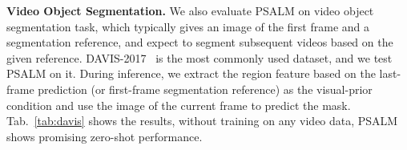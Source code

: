\begin{table}[h!]
\centering
\footnotesize
\caption{Our method's zero-shot performance on DAVIS-2017 \textit{val}. Note the SEEM report results on 345 randomly sampled frames, while others are evaluated on all frames.}
\renewcommand{\arraystretch}{0.9}
\label{tab:davis}
\end{table}

\noindent\textbf{Video Object Segmentation.} 
We also evaluate PSALM on video object segmentation task, which typically gives an image of the first frame and a segmentation reference, and expect to segment subsequent videos based on the given reference. DAVIS-2017~\cite{davis} is the most commonly used dataset, and we test PSALM on it. During inference, we extract the region feature based on the last-frame prediction (or first-frame segmentation reference) as the visual-prior condition and use the image of the current frame to predict the mask. Tab.~\ref{tab:davis} shows the results, without training on any video data, PSALM shows promising zero-shot performance. 

